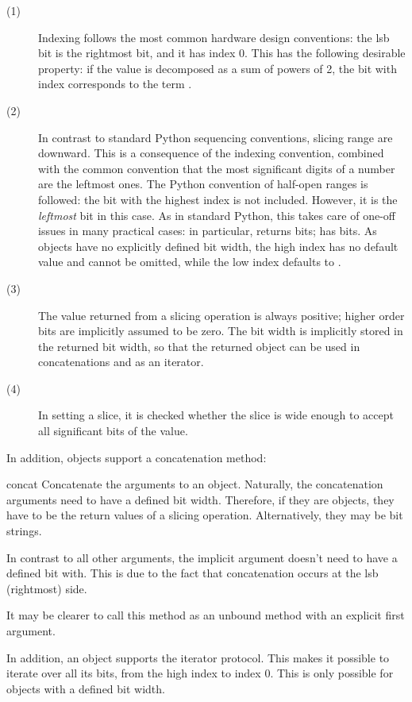 \begin{description}
\item[(1)] Indexing follows the most common hardware design
	  conventions: the lsb bit is the rightmost bit, and it has
	  index 0. This has the following desirable property: if the
	   value is decomposed as a sum of powers of 2,
	  the bit with index  corresponds to the term
	  .

\item[(2)] In contrast to standard Python sequencing conventions,
	  slicing range are downward. This is a consequence of the
	  indexing convention, combined with the common convention
	  that the most significant digits of a number are the
	  leftmost ones. The Python convention of half-open ranges is
	  followed: the bit with the highest index is not
	  included. However, it is the \emph{leftmost} bit in this
	  case. As in standard Python, this takes care of one-off
	  issues in many practical cases: in particular,
	   returns  bits;
	   has 
	  bits. As  objects have no explicitly defined
	  bit width, the high index  has no default value and
	  cannot be omitted, while the low index  defaults to
	  .

\item[(3)] The value returned from a slicing operation is always
	  positive; higher order bits are implicitly assumed to be
	  zero. The bit width is implicitly stored in the returned bit
	  width, so that the returned object can be used in
	  concatenations and as an iterator.

\item[(4)] In setting a slice, it is checked whether the slice is wide
	  enough to accept all significant bits of the value.
\end{description}

In addition,  objects support a concatenation method:

\begin{methoddesc}[intbv]{concat}{}
Concatenate the arguments to an  object. Naturally, the
concatenation arguments need to have a defined bit width. Therefore,
if they are  objects, they have to be the return values
of a slicing operation. Alternatively, they may be bit strings.

In contrast to all other arguments, the implicit  argument
doesn't need to have a defined bit with. This is due to the fact that
concatenation occurs at the lsb (rightmost) side.

It may be clearer to call this method as an unbound method with an
explicit first  argument.
\end{methoddesc}

In addition, an  object supports the iterator protocol. This
makes it possible to iterate over all its bits, from the high index to
index 0. This is only possible for  objects with a
defined bit width.











